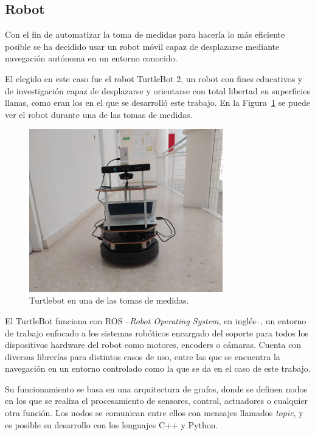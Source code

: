 \subsection{Robot}

Con el fin de automatizar la toma de medidas para hacerla lo más eficiente posible se ha decidido usar un robot móvil capaz de desplazarse mediante navegación autónoma en un entorno conocido.

El elegido en este caso fue el robot TurtleBot 2, un robot con fines educativos y de investigación capaz de desplazarse y orientarse con total libertad en superficies llanas, como eran los en el que se desarrolló este trabajo.
En la Figura~\ref{fig:robot} se puede ver el robot durante una de las tomas de medidas.

\begin{figure}[H]
    \centering
    \includegraphics[width=0.75\textwidth]{pic/robot_fisica.jpg}
    \caption{Turtlebot en una de las tomas de medidas.}
    \label{fig:robot}
\end{figure}

El TurtleBot funciona con ROS --\textit{Robot Operating System}, en inglés--, un entorno de trabajo enfocado a los sistemas robóticos encargado del soporte para todos los dispositivos hardware del robot como motores, encoders o cámaras. 
Cuenta con diversas librerías para distintos casos de uso, entre las que se encuentra la navegación en un entorno controlado como la que se da en el caso de este trabajo.

Su funcionamiento se basa en una arquitectura de grafos, donde se definen nodos en los que se realiza el procesamiento de sensores, control, actuadores o cualquier otra función.
Los nodos se comunican entre ellos con mensajes llamados \textit{topic}, y es posible su desarrollo con los lenguajes C++ y Python.

